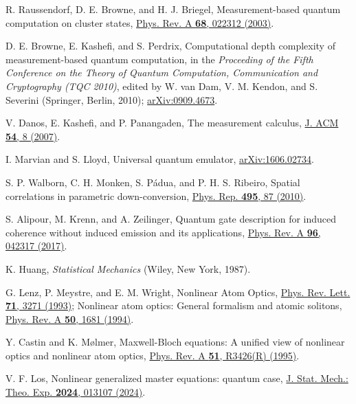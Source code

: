 \documentclass[aps,pra,twocolumn,floatfix,groupedaddress,superscriptaddress,nofootinbib,notitlepage]{revtex4-2}
\begin{document}
\begin{thebibliography}{100}
 R. Raussendorf, D. E. Browne, and H. J. Briegel, Measurement-based quantum computation on cluster states, \href{https://doi.org/10.1103/PhysRevA.68.022312}{Phys. Rev. A \textbf{68}, 022312 (2003)}.

 D. E. Browne, E. Kashefi, and S. Perdrix, Computational depth complexity of measurement-based quantum computation, in the \emph{Proceeding of the Fifth Conference on the Theory of Quantum Computation, Communication and Cryptography (TQC 2010)}, edited by W. van Dam, V. M. Kendon, and S. Severini (Springer, Berlin, 2010); \href{https://doi.org/10.48550/arXiv.0909.4673}{arXiv:0909.4673}.

 V. Danos, E. Kashefi, and P. Panangaden, The measurement calculus, \href{https://doi.org/10.1145/1219092.1219096}{J. ACM \textbf{54}, 8 (2007)}.

 I. Marvian and S. Lloyd, Universal quantum emulator, \href{https://doi.org/10.48550/arXiv.1606.02734}{arXiv:1606.02734}.

 S. P. Walborn, C. H. Monken, S. P\'{a}dua, and P. H. S. Ribeiro, Spatial correlations in parametric down-conversion, \href{https://doi.org/10.1016/j.physrep.2010.06.003}{Phys. Rep. \textbf{495}, 87 (2010)}.

 S. Alipour, M. Krenn, and A. Zeilinger, Quantum gate description for induced coherence without induced emission and its applications, \href{https://doi.org/10.1103/PhysRevA.96.042317}{Phys. Rev. A \textbf{96}, 042317 (2017)}.

 K. Huang, \emph{Statistical Mechanics} (Wiley, New York, 1987).

 G. Lenz, P. Meystre, and E. M. Wright, Nonlinear Atom Optics, \href{https://doi.org/10.1103/PhysRevLett.71.3271}{Phys. Rev. Lett. \textbf{71}, 3271 (1993)}; Nonlinear atom optics: General formalism and atomic solitons, \href{https://doi.org/10.1103/PhysRevA.50.1681}{Phys. Rev. A \textbf{50}, 1681 (1994)}.

 Y. Castin and K. M{\o}lmer, Maxwell-Bloch equations: A unified view of nonlinear optics and nonlinear atom optics, \href{https://doi.org/10.1103/PhysRevA.51.R3426}{Phys. Rev. A \textbf{51}, R3426(R) (1995)}.

 V. F. Los, Nonlinear generalized master equations: quantum case, \href{https://doi.org/10.1088/1742-5468/ad0f92}{J. Stat. Mech.: Theo. Exp. \textbf{2024}, 013107 (2024)}.


\end{thebibliography}
\end{document}

